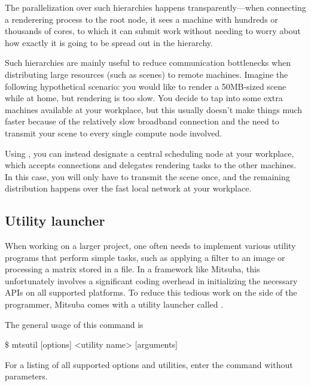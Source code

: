 The parallelization over such hierarchies happens transparently---when 
connecting a renderering process to the root node, it sees a machine 
with hundreds or thousands of cores, to which it can submit work without
needing to worry about how exactly it is going to be spread out in 
the hierarchy.

Such hierarchies are mainly useful to reduce communication bottlenecks when distributing
large resources (such as scenes) to remote machines. Imagine the following hypothetical scenario:
you would like to render a 50MB-sized scene while at home, but rendering is too slow. 
You decide to tap into some extra machines available
at your workplace, but this usually doesn't make things much faster because of the relatively slow broadband
connection and the need to transmit your scene to every single compute node involved. 

Using , you can
instead designate a central scheduling node at your workplace, which accepts connections and delegates
rendering tasks to the other machines. In this case, you will only have to transmit the scene once,
and the remaining distribution happens over the fast local network at your workplace.
\subsection{Utility launcher}
\label{sec:mtsutil}
When working on a larger project, one often needs to implement various utility programs that 
perform simple tasks, such as applying a filter to an image or processing
a matrix stored in a file. In a framework like Mitsuba, this unfortunately involves 
a significant coding overhead in initializing the necessary APIs on all supported platforms. 
To reduce this tedious work on the side of the programmer, Mitsuba comes with a utility launcher
called .

The general usage of this command is
\begin{shell}
$\texttt{\$}$ mtsutil [options] <utility name> [arguments]
\end{shell}
For a listing of all supported options and utilities, enter the command without parameters.
